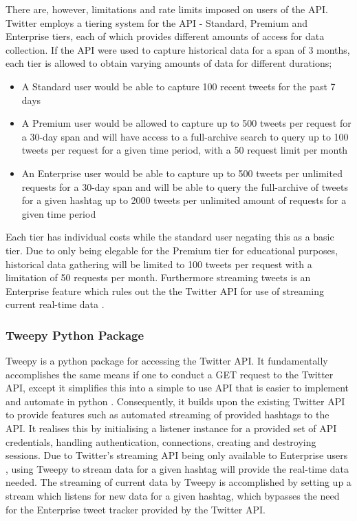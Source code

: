 \documentclass[oneside, 10pt]{article}
\begin{document}
			There are, however, limitations and rate limits imposed on users of the API. Twitter employs a tiering system for the API - Standard, Premium and Enterprise tiers, each of which provides different amounts of access for data collection. If the API were used to capture historical data for a span of 3 months, each tier is allowed to obtain varying amounts of data for different durations; \cite{7}
			
			\begin{itemize}
				\item A Standard user would be able to capture 100 recent tweets for the past 7 days
				\item A Premium user would be allowed to capture up to 500 tweets per request for a 30-day span and will have access to a full-archive search to query up to 100 tweets per request for a given time period, with a 50 request limit per month
				\item An Enterprise user would be able to capture up to 500 tweets per unlimited requests for a 30-day span and will be able to query the full-archive of tweets for a given hashtag up to 2000 tweets per unlimited amount of requests for a given time period
			\end{itemize}
		
			Each tier has individual costs while the standard user negating this as a basic tier. Due to only being elegable for the Premium tier for educational purposes, historical data gathering will be limited to 100 tweets per request with a limitation of 50 requests per month. Furthermore streaming tweets is an Enterprise feature which rules out the the Twitter API for use of streaming current real-time data \cite{8}.
		
			\subsubsection{Tweepy Python Package}
			Tweepy is a python package for accessing the Twitter API. It fundamentally accomplishes the same means if one to conduct a GET request to the Twitter API, except it simplifies this into a simple to use API that is easier to implement and automate in python \cite{9}. Consequently, it builds upon the existing Twitter API to provide features such as automated streaming of provided hashtags to the API. It realises this by initialising a listener instance for a provided set of API credentials, handling authentication, connections, creating and destroying sessions. Due to Twitter's streaming API being only available to Enterprise users \cite{7}, using Tweepy to stream data for a given hashtag will provide the real-time data needed. The streaming of current data by Tweepy is accomplished by setting up a stream which listens for new data for a given hashtag, which bypasses the need for the Enterprise tweet tracker provided by the Twitter API.
			
\end{document}
